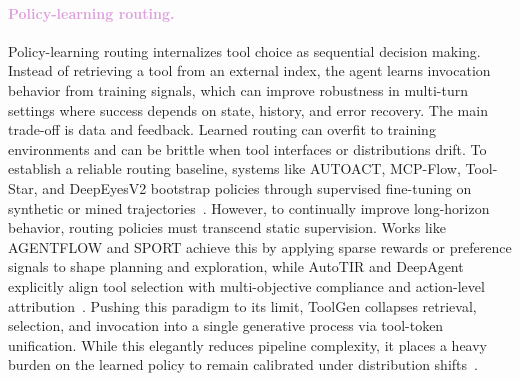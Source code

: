 \paragraph{\textcolor{Plum}{Policy-learning routing.}} Policy-learning routing internalizes tool choice as sequential decision making. Instead of retrieving a tool from an external index, the agent learns invocation behavior from training signals, which can improve robustness in multi-turn settings where success depends on state, history, and error recovery. The main trade-off is data and feedback. Learned routing can overfit to training environments and can be brittle when tool interfaces or distributions drift. To establish a reliable routing baseline, systems like AUTOACT, MCP-Flow, Tool-Star, and DeepEyesV2 bootstrap policies through supervised fine-tuning on synthetic or mined trajectories~\citep{qiao2024autoactautomaticagentlearning, wang2025mcpflowfacilitatingllmagents, dong2025tool, hong2025deepeyesv2agenticmultimodalmodel}. However, to continually improve long-horizon behavior, routing policies must transcend static supervision. Works like AGENTFLOW and SPORT achieve this by applying sparse rewards or preference signals to shape planning and exploration, while AutoTIR and DeepAgent explicitly align tool selection with multi-objective compliance and action-level attribution~\citep{li2025intheflowagenticoptimizationeffective, li2025iterative, wei2025autotirautonomoustoolsintegrated, li2025deepagentgeneralreasoningagent}. Pushing this paradigm to its limit, ToolGen collapses retrieval, selection, and invocation into a single generative process via tool-token unification. While this elegantly reduces pipeline complexity, it places a heavy burden on the learned policy to remain calibrated under distribution shifts~\citep{wang2025toolgenunifiedtoolretrieval}.


